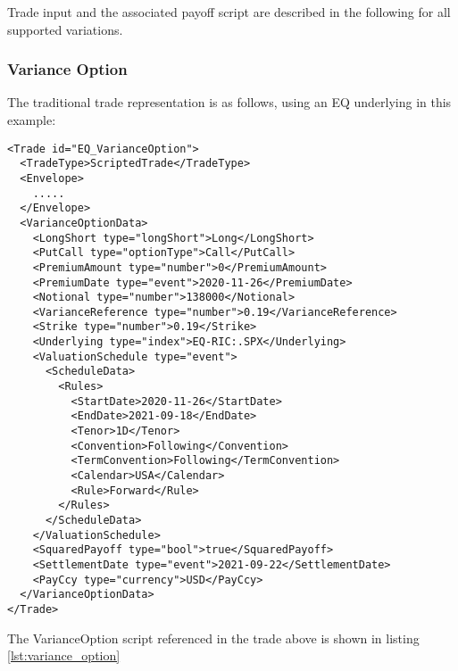 Trade input and the associated payoff script are described in the following for all supported variations.

\subsubsection*{Variance Option}

The traditional trade representation is as follows, using an EQ underlying in this example:

\begin{verbatim}
<Trade id="EQ_VarianceOption">
  <TradeType>ScriptedTrade</TradeType>
  <Envelope>
    .....
  </Envelope>
  <VarianceOptionData>
    <LongShort type="longShort">Long</LongShort>
    <PutCall type="optionType">Call</PutCall>
    <PremiumAmount type="number">0</PremiumAmount>
    <PremiumDate type="event">2020-11-26</PremiumDate>
    <Notional type="number">138000</Notional>
    <VarianceReference type="number">0.19</VarianceReference>
    <Strike type="number">0.19</Strike>
    <Underlying type="index">EQ-RIC:.SPX</Underlying>
    <ValuationSchedule type="event">
      <ScheduleData>
        <Rules>
          <StartDate>2020-11-26</StartDate>
          <EndDate>2021-09-18</EndDate>
          <Tenor>1D</Tenor>
          <Convention>Following</Convention>
          <TermConvention>Following</TermConvention>
          <Calendar>USA</Calendar>
          <Rule>Forward</Rule>
        </Rules>
      </ScheduleData>
    </ValuationSchedule>
    <SquaredPayoff type="bool">true</SquaredPayoff>
    <SettlementDate type="event">2021-09-22</SettlementDate>
    <PayCcy type="currency">USD</PayCcy>
  </VarianceOptionData>
</Trade>
\end{verbatim}

The VarianceOption script referenced in the trade above is shown in listing
\ref{lst:variance_option}

